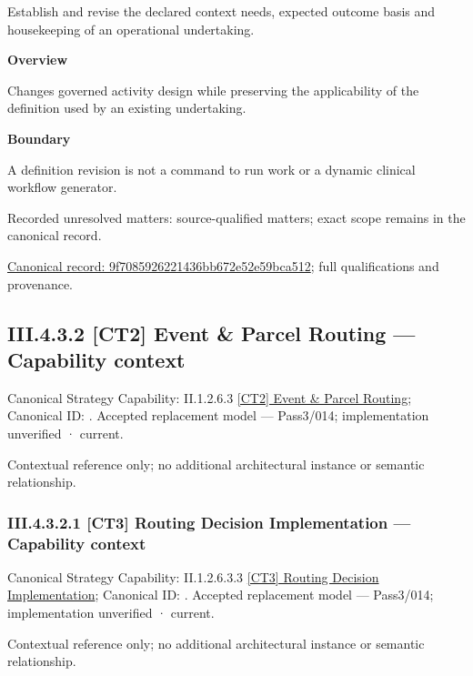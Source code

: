 Establish and revise the declared context needs, expected outcome basis and housekeeping of an operational undertaking.



\textbf{Overview}



Changes governed activity design while preserving the applicability of the definition used by an existing undertaking.



\textbf{Boundary}



A definition revision is not a command to run work or a dynamic clinical workflow generator.


{\small Recorded unresolved matters: source-qualified matters; exact scope remains in the canonical record.}\par
{\footnotesize \href{../../../../../../../continuum/business/business-function/9f7085926221436bb672e52e59bca512.md}{Canonical record: 9f7085926221436bb672e52e59bca512}; full qualifications and provenance.}\par
\subsection*{III.4.3.2 [CT2] Event \& Parcel Routing — Capability context}
\label{navigation:III.4.3.2}

{\small Canonical Strategy Capability: II.1.2.6.3 \hyperref[element:3651fa9017f84b81a8a12b7a9a6c01a4]{[CT2] Event \& Parcel Routing}; Canonical ID: \texttt{}. Accepted replacement model — Pass3/014; implementation unverified · current.}\par
Contextual reference only; no additional architectural instance or semantic relationship.\par
\subsubsection*{III.4.3.2.1 [CT3] Routing Decision Implementation — Capability context}
\label{navigation:III.4.3.2.1}

{\small Canonical Strategy Capability: II.1.2.6.3.3 \hyperref[element:2272dc936e6a4243a12049cd007df5d5]{[CT3] Routing Decision Implementation}; Canonical ID: \texttt{}. Accepted replacement model — Pass3/014; implementation unverified · current.}\par
Contextual reference only; no additional architectural instance or semantic relationship.\par
